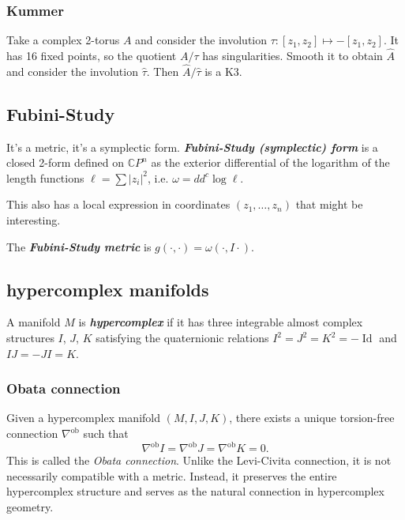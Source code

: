 \subsubsection{Kummer}

Take a complex 2-torus \(A\) and consider the involution \(\tau:[z_1,z_2]\mapsto -[z_1,z_2]\). It has 16 fixed points, so the quotient \(A/\tau\) has singularities. Smooth it to obtain \(\hat{A}\) and consider the involution \(\hat{\tau}\). Then \(\hat{A}/\hat{\tau}\) is a K3.

\subsection{Fubini-Study}
It's a metric, it's a symplectic form. \textit{\textbf{Fubini-Study (symplectic) form}} is a closed 2-form defined on \(\mathbb{C}P^{n}\) as the exterior differential of the logarithm of the length functions \(\ell=\sum |z_i|^2\), i.e. \(\omega=dd^c \operatorname{log} \ell\).

This also has a local expression in coordinates \((z_1,\ldots,z_n)\) that might be interesting.

The \textit{\textbf{Fubini-Study metric}} is \(g(\cdot ,\cdot )=\omega(\cdot ,I\cdot )\).

\subsection{hypercomplex manifolds}

\begin{defn}\leavevmode
	A manifold $M$ is \textit{\textbf{hypercomplex}} if it has three integrable almost complex structures  $I$,  $J$, $K$ satisfying the quaternionic relations $I^2=J^2=K^2=-\operatorname{Id}$ and $I J=-J I=K$.
\end{defn}

\subsubsection{Obata connection}

\begin{remark}
    Given a hypercomplex manifold $(M, I, J, K)$, there exists a unique torsion-free connection $\nabla^{\operatorname{ob}}$ such that
    \[
    \nabla^{\operatorname{ob}} I = \nabla^{\operatorname{ob}} J = \nabla^{\operatorname{ob}} K = 0.
    \]
    This is called the \textit{Obata connection}. Unlike the Levi-Civita connection, it is not necessarily compatible with a metric. Instead, it preserves the entire hypercomplex structure and serves as the natural connection in hypercomplex geometry.
\end{remark}

